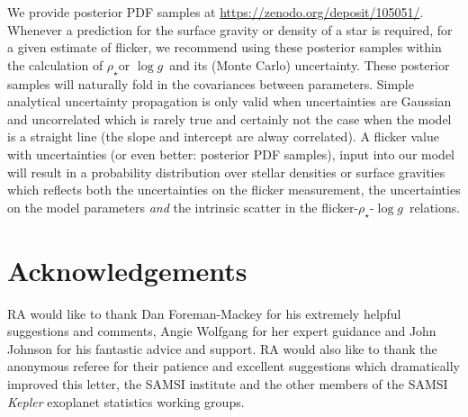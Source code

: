 \documentclass[apjl]{emulateapj}
\newcommand{\logg}{$\log g$}
\newcommand{\rhostar}{$\rho_{\star}$}
\begin{document}
We provide posterior PDF samples at \url{https://zenodo.org/deposit/105051/}.
Whenever a prediction for the surface gravity or density of a star is required,
for a given estimate of flicker, we recommend using these posterior samples
within the calculation of \rhostar or \logg\ and its (Monte Carlo)
uncertainty.
These posterior samples will naturally fold in the covariances between
parameters.
Simple analytical uncertainty propagation is only valid when uncertainties are
Gaussian and uncorrelated which is rarely true and certainly not the case when
the model is a straight line (the slope and intercept are alway correlated).
A flicker value with uncertainties (or even better: posterior PDF
samples), input into our model will result in a probability distribution over
stellar densities or surface gravities which reflects both the uncertainties
on the flicker measurement, the uncertainties on the model parameters {\it and}
the intrinsic scatter in the flicker-\rhostar-\logg\ relations.

\acknowledgements
\section*{Acknowledgements}

RA would like to thank Dan Foreman-Mackey for his extremely helpful suggestions
and comments, Angie Wolfgang for her expert guidance and John Johnson for his
fantastic advice and support.
RA would also like to thank the anonymous referee for their patience and
excellent suggestions which dramatically improved this letter, the SAMSI
institute and the other members of the SAMSI {\it Kepler} exoplanet statistics
working groups.

\end{document}
